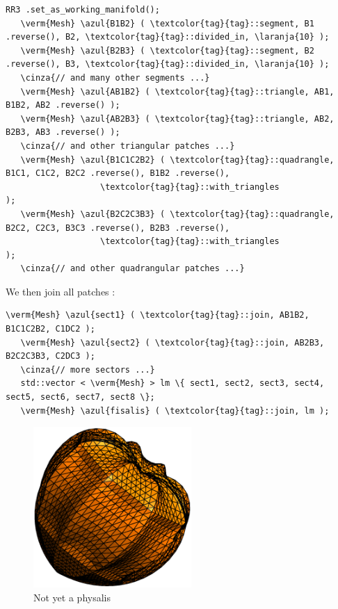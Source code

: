 \begin{Verbatim}[commandchars=\\\{\},formatcom=\small\tt,frame=single,
   label=parag-\ref{\numb section 2.\numb parag 14}.cpp,rulecolor=\color{moldura},
   baselinestretch=0.94,framesep=2mm]
   RR3 .set_as_working_manifold();
   \verm{Mesh} \azul{B1B2} ( \textcolor{tag}{tag}::segment, B1 .reverse(), B2, \textcolor{tag}{tag}::divided_in, \laranja{10} );
   \verm{Mesh} \azul{B2B3} ( \textcolor{tag}{tag}::segment, B2 .reverse(), B3, \textcolor{tag}{tag}::divided_in, \laranja{10} );
   \cinza{// and many other segments ...}
   \verm{Mesh} \azul{AB1B2} ( \textcolor{tag}{tag}::triangle, AB1, B1B2, AB2 .reverse() );
   \verm{Mesh} \azul{AB2B3} ( \textcolor{tag}{tag}::triangle, AB2, B2B3, AB3 .reverse() );
   \cinza{// and other triangular patches ...}
   \verm{Mesh} \azul{B1C1C2B2} ( \textcolor{tag}{tag}::quadrangle, B1C1, C1C2, B2C2 .reverse(), B1B2 .reverse(),
                   \textcolor{tag}{tag}::with_triangles                                           );
   \verm{Mesh} \azul{B2C2C3B3} ( \textcolor{tag}{tag}::quadrangle, B2C2, C2C3, B3C3 .reverse(), B2B3 .reverse(),
                   \textcolor{tag}{tag}::with_triangles                                           );
   \cinza{// and other quadrangular patches ...}   
\end{Verbatim}

We then join all patches :
\begin{Verbatim}[commandchars=\\\{\},formatcom=\small\tt,frame=single,
   label=parag-\ref{\numb section 2.\numb parag 14}.cpp,rulecolor=\color{moldura},
   baselinestretch=0.94,framesep=2mm]
   \verm{Mesh} \azul{sect1} ( \textcolor{tag}{tag}::join, AB1B2, B1C1C2B2, C1DC2 );
   \verm{Mesh} \azul{sect2} ( \textcolor{tag}{tag}::join, AB2B3, B2C2C3B3, C2DC3 );
   \cinza{// more sectors ...}
   std::vector < \verm{Mesh} > lm \{ sect1, sect2, sect3, sect4, sect5, sect6, sect7, sect8 \};
   \verm{Mesh} \azul{fisalis} ( \textcolor{tag}{tag}::join, lm ); 
\end{Verbatim}

\begin{figure}[ht] \centering
  \includegraphics[width=60mm]{fisalis-round}
  \caption{Not yet a physalis}
  \label{\numb section 2.\numb fig 16}
\end{figure}

